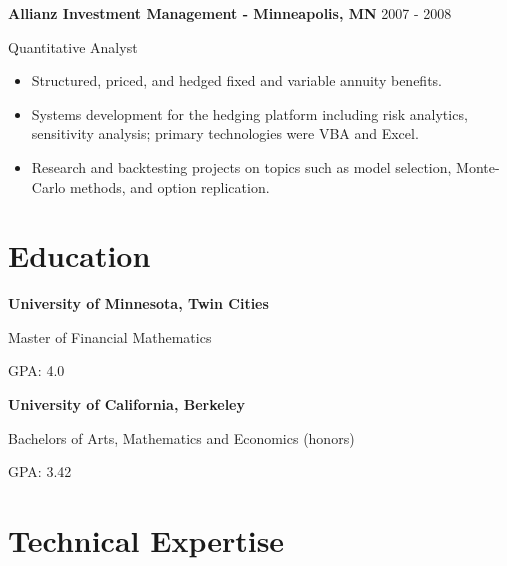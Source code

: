 \documentclass[11pt,a4paper,]{awesome-cv}
\begin{document}
\pagebreak

\normalsize

\textbf{Allianz Investment Management - Minneapolis, MN} \hfill 2007 -
2008

\vspace{-1ex}

Quantitative Analyst

\vspace{-1.5ex}

\small

\begin{itemize}
\item
  Structured, priced, and hedged fixed and variable annuity benefits.
  \vspace{-0.5ex}
\item
  Systems development for the hedging platform including risk analytics,
  sensitivity analysis; primary technologies were VBA and Excel.
  \vspace{-0.5ex}
\item
  Research and backtesting projects on topics such as model selection,
  Monte-Carlo methods, and option replication. \vspace{-0.5ex}
\end{itemize}

\normalsize

\hypertarget{education}{%
\section{Education}\label{education}}

\textbf{University of Minnesota, Twin Cities}

\vspace{-1ex}

Master of Financial Mathematics

\vspace{-1ex}

GPA: 4.0

\textbf{University of California, Berkeley}

\vspace{-1ex}

Bachelors of Arts, Mathematics and Economics (honors)

\vspace{-1ex}

GPA: 3.42

\hypertarget{technical-expertise}{%
\section{Technical Expertise}\label{technical-expertise}}
\end{document}

